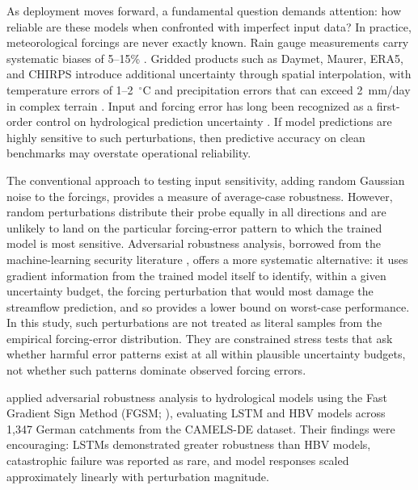 \documentclass[final]{agujournal2019}
\begin{document}
As deployment moves forward, a fundamental question demands attention: how reliable are these models when confronted with imperfect input data? In practice, meteorological forcings are never exactly known. Rain gauge measurements carry systematic biases of 5--15\% \cite{Sevruk1982, Groisman1994}. Gridded products such as Daymet, Maurer, ERA5, and CHIRPS introduce additional uncertainty through spatial interpolation, with temperature errors of 1--2~$^\circ$C and precipitation errors that can exceed 2~mm/day in complex terrain \cite{Thornton2021, Hersbach2020}. Input and forcing error has long been recognized as a first-order control on hydrological prediction uncertainty \cite{Beven2006, Kavetski2006, Renard2010, Clark2008, McMillan2012}. If model predictions are highly sensitive to such perturbations, then predictive accuracy on clean benchmarks may overstate operational reliability.

The conventional approach to testing input sensitivity, adding random Gaussian noise to the forcings, provides a measure of average-case robustness. However, random perturbations distribute their probe equally in all directions and are unlikely to land on the particular forcing-error pattern to which the trained model is most sensitive. Adversarial robustness analysis, borrowed from the machine-learning security literature \cite{Goodfellow2015, Madry2018}, offers a more systematic alternative: it uses gradient information from the trained model itself to identify, within a given uncertainty budget, the forcing perturbation that would most damage the streamflow prediction, and so provides a lower bound on worst-case performance. In this study, such perturbations are not treated as literal samples from the empirical forcing-error distribution. They are constrained stress tests that ask whether harmful error patterns exist at all within plausible uncertainty budgets, not whether such patterns dominate observed forcing errors.

 applied adversarial robustness analysis to hydrological models using the Fast Gradient Sign Method (FGSM; ), evaluating LSTM and HBV models across 1,347 German catchments from the CAMELS-DE dataset. Their findings were encouraging: LSTMs demonstrated greater robustness than HBV models, catastrophic failure was reported as rare, and model responses scaled approximately linearly with perturbation magnitude.
\end{document}
